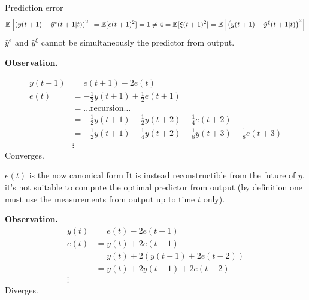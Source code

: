 Prediction error
\[
	\mathbb{E}\left[ \left( y(t+1)-\hat y^{e}(t+1|t)  \right) ^2   \right]  =\mathbb{E}[e(t+1)^2 ]=1\neq 4=\mathbb{E}[\xi(t+1)^2 ]=\mathbb{E}\left[ \left( y(t+1)-\hat y ^{\xi}(t+1|t)  \right)^2    \right]  
\]
$\hat y^{e} $ and $\hat y^{\xi} $ cannot be simultaneously the predictor from output.

\textbf{Observation.}

\begin{align*}
	y(t+1)&=e(t+1)-2e(t)\\
	e(t)&=-\frac{1}{2} y(t+1)+\frac{1}{2} e(t+1)\\
	&= \ldots \text{recursion}\ldots \\
	&= -\frac{1}{2} y(t+1)-\frac{1}{2} y(t+2)+\frac{1}{4}e(t+2)\\
	&=-\frac{1}{2} y(t+1)-\frac{1}{4}y(t+2)-\frac{1}{8}y(t+3)+\frac{1}{8}e(t+3)\\
	&\vdots
\end{align*}
Converges.

$e(t)$ is the now canonical form 
It is instead reconstructible from the future of $y$, it's not suitable to compute the optimal predictor from output (by definition one must use the measurements from output up to time $t$ only).

\textbf{Observation.}
\begin{align*}
	y(t)&=e(t)-2e(t-1)\\
	e(t)&=y(t)+2e(t-1)\\
	&=y(t)+2(y(t-1)+2e(t-2))\\
	&=y(t)+2y(t-1)+2e(t-2)\\
	\vdots
\end{align*}
Diverges.


